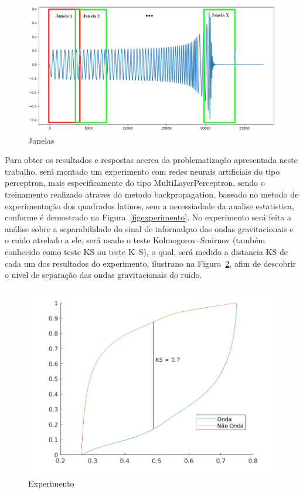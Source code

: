 \begin{figure}[ht]
\centering
\includegraphics[width=1\textwidth]{figuras/janelas.png}
\caption{Janelas}
\label{figjanela}
\end{figure}

Para obter os resultados e respostas acerca da problematização apresentada neste trabalho, será montado um experimento com redes neurais artificiais do tipo perceptron, mais especificamente do tipo MultiLayerPerceptron, sendo o treinamento realizado atraves do metodo backpropagation, baseado no metodo de experimentação dos quadrados latinos, sem a necessiadade da analise estatistica, conforme é demostrado na Figura~\ref{figexperimento}. No experimento será feita a análise sobre a separabilidade do sinal de informalçao das ondas gravitacionais e o ruido atrelado a ele, será usado o teste Kolmogorov–Smirnov (também conhecido como teste KS ou teste K–S), o qual, será medido a distancia KS de cada um dos resultados do experimento, ilustrano na Figura~\ref{figkolmogorov}, afim de descobrir o nivel de separação das ondas gravitacionais do ruido.

\begin{figure}[ht]
\centering
\includegraphics[width=1\textwidth]{figuras/test-kolmogorov.png}
\caption{Experimento}
\label{figkolmogorov}
\end{figure}


